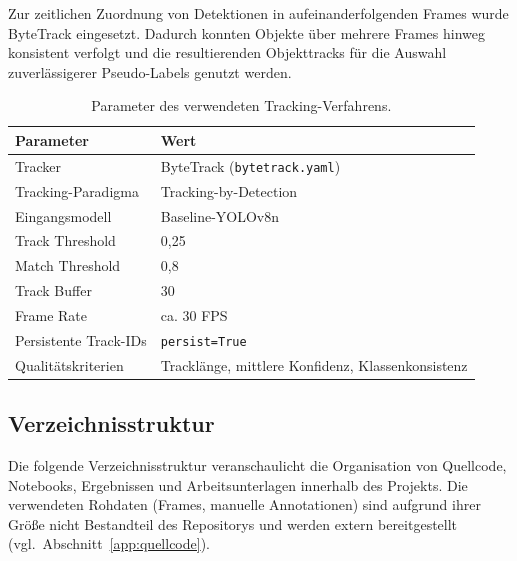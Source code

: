 Zur zeitlichen Zuordnung von Detektionen in aufeinanderfolgenden Frames wurde
ByteTrack eingesetzt. Dadurch konnten Objekte über mehrere Frames hinweg
konsistent verfolgt und die resultierenden Objekttracks für die Auswahl
zuverlässigerer Pseudo-Labels genutzt werden.

\begin{table}[H]
    \centering
    \caption{Parameter des verwendeten Tracking-Verfahrens.}
    \label{tab:anhang_tracking_params}
    \begin{tabular}{ll}
        \toprule
        \textbf{Parameter}    & \textbf{Wert}                                     \\
        \midrule
        Tracker               & ByteTrack (\texttt{bytetrack.yaml})               \\
        Tracking-Paradigma    & Tracking-by-Detection                             \\
        Eingangsmodell        & Baseline-YOLOv8n                                  \\
        Track Threshold       & 0{,}25                                            \\
        Match Threshold       & 0{,}8                                             \\
        Track Buffer          & 30                                                \\
        Frame Rate            & ca. 30 FPS                                        \\
        Persistente Track-IDs & \texttt{persist=True}                             \\
        Qualitätskriterien    & Tracklänge, mittlere Konfidenz, Klassenkonsistenz \\
        \bottomrule
    \end{tabular}
\end{table}

\subsection{Verzeichnisstruktur}

Die folgende Verzeichnisstruktur veranschaulicht die Organisation von
Quellcode, Notebooks, Ergebnissen und Arbeitsunterlagen innerhalb des
Projekts. Die verwendeten Rohdaten (Frames, manuelle Annotationen) sind
aufgrund ihrer Größe nicht Bestandteil des Repositorys und werden extern
bereitgestellt (vgl.\ Abschnitt~\ref{app:quellcode}).

